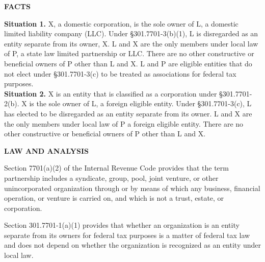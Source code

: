 \begin{select}
\begin{center}\textbf{FACTS}
\end{center} 
\textbf{Situation 1.} X, a domestic corporation, is the sole owner of L, a domestic limited liability company 
(LLC). Under \S301.7701-3(b)(1), L is disregarded as an entity separate from its owner, X. L and X 
are the only members under local law of P, a state law limited partnership or LLC. There are no 
other constructive or beneficial owners of P other than L and X. L and P are eligible entities that do not elect under \S301.7701-3(c) to be treated as associations for federal tax purposes.\\ 

\textbf{Situation 2.} X is an entity that is classified as a corporation under \S301.7701-2(b). X is the sole 
owner of L, a foreign eligible entity. Under \S301.7701-3(c), L has elected to be disregarded as an 
entity separate from its owner. L and X are the only members under local law of P a foreign eligible 
entity. There are no other constructive or beneficial owners of P other than L and X. 
\begin{center}\textbf{LAW AND ANALYSIS}
\end{center}

Section 7701(a)(2) of the Internal Revenue Code provides that the term partnership includes a 
syndicate, group, pool, joint venture, or other unincorporated organization through or by means of 
which any business, financial operation, or venture is carried on, and which is not a trust, estate, or corporation. 

Section 301.7701-1(a)(1) provides that whether an organization is an entity separate from its 
owners for federal tax purposes is a matter of federal tax law and does not depend on whether the 
organization is recognized as an entity under local law.
 

\end{select}
